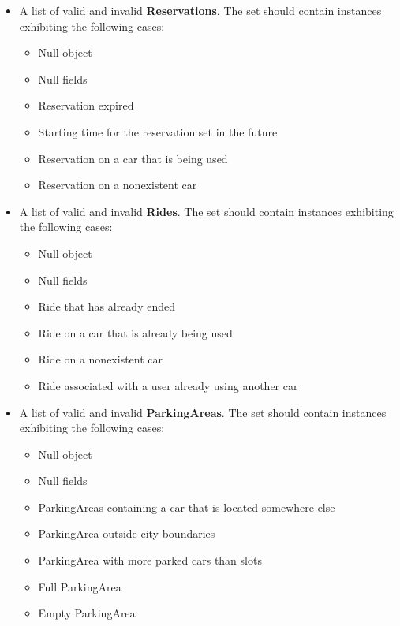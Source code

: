 		\begin{itemize}
			\item A list of valid and invalid \textbf{Reservations}. The set should contain instances exhibiting the following cases:
				\begin{itemize}
					\item Null object
					\item Null fields
					\item Reservation expired
					\item Starting time for the reservation set in the future
					\item Reservation on a car that is being used
					\item Reservation on a nonexistent car
				\end{itemize}
		\end{itemize}
		
		\begin{itemize}
			\item A list of valid and invalid \textbf{Rides}. The set should contain instances exhibiting the following cases:
				\begin{itemize}
					\item Null object
					\item Null fields
					\item Ride that has already ended
					\item Ride on a car that is already being used
					\item Ride on a nonexistent car
					\item Ride associated with a user already using another car
				\end{itemize}
		\end{itemize}
		
		\begin{itemize}
			\item A list of valid and invalid \textbf{ParkingAreas}. The set should contain instances exhibiting the following cases:
				\begin{itemize}
					\item Null object
					\item Null fields
					\item ParkingAreas containing a car that is located somewhere else
					\item ParkingArea outside city boundaries
					\item ParkingArea with more parked cars than slots
					\item Full ParkingArea
					\item Empty ParkingArea
				\end{itemize}
		\end{itemize}
		
